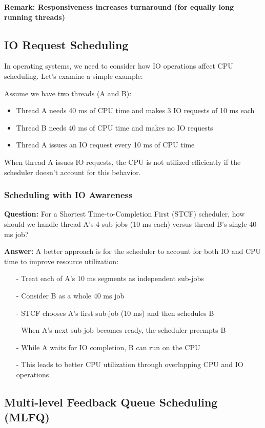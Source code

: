 \documentclass[../../compsys.tex]{subfiles}
\begin{document}
\textbf{Remark: Responsiveness increases turnaround (for equally long running threads)}
\subsection{IO Request Scheduling}
In operating systems, we need to consider how IO operations affect CPU scheduling. Let's examine a simple example:

Assume we have two threads (A and B):
\begin{itemize}
    \item Thread A needs 40 ms of CPU time and makes 3 IO requests of 10 ms each
    \item Thread B needs 40 ms of CPU time and makes no IO requests
    \item Thread A issues an IO request every 10 ms of CPU time
\end{itemize}

When thread A issues IO requests, the CPU is not utilized efficiently if the scheduler doesn't account for this behavior.

\subsubsection{Scheduling with IO Awareness}
\textbf{Question: } For a Shortest Time-to-Completion First (STCF) scheduler, how should we handle thread A's 4 sub-jobs (10 ms each) versus thread B's single 40 ms job?

\textbf{Answer: } A better approach is for the scheduler to account for both IO and CPU time to improve resource utilization:
\begin{itemize}
    \item[-] Treat each of A's 10 ms segments as independent sub-jobs
    \item[-] Consider B as a whole 40 ms job
    \item[-] STCF chooses A's first sub-job (10 ms) and then schedules B
    \item[-] When A's next sub-job becomes ready, the scheduler preempts B
    \item[-] While A waits for IO completion, B can run on the CPU
    \item[-] This leads to better CPU utilization through overlapping CPU and IO operations
\end{itemize}

\subsection{Multi-level Feedback Queue Scheduling (MLFQ)}
\end{document}
